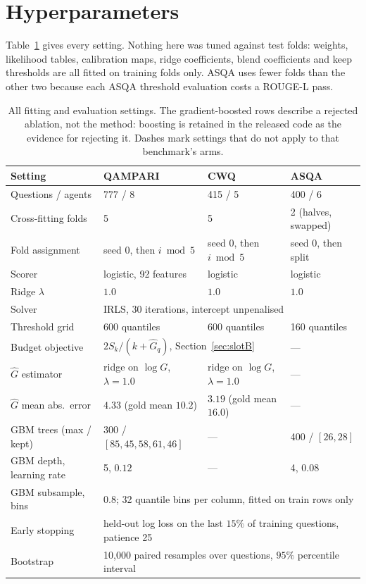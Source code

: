 \documentclass[11pt]{article}
\begin{document}
\section{Hyperparameters}
\label{app:hyper}

Table~\ref{tab:hyper} gives every setting. Nothing here was tuned against test folds: weights, likelihood tables, calibration maps, ridge coefficients, blend coefficients and keep thresholds are all fitted on training folds only. ASQA uses fewer folds than the other two because each ASQA threshold evaluation costs a ROUGE-L pass.

\begin{table}[t]
  \caption{All fitting and evaluation settings. The gradient-boosted rows describe a rejected ablation, not the method: boosting is retained in the released code as the evidence for rejecting it. Dashes mark settings that do not apply to that benchmark's arms.}
  \label{tab:hyper}
  \centering
  \begin{tabular}{llll}
    \toprule
    Setting & QAMPARI & CWQ & ASQA \\
    \midrule
    Questions / agents          & 777 / 8 & 415 / 5 & 400 / 6 \\
    Cross-fitting folds         & 5 & 5 & 2 (halves, swapped) \\
    Fold assignment             & seed 0, then $i \bmod 5$ & seed 0, then $i \bmod 5$ & seed 0, then split \\
    \midrule
    Scorer                      & logistic, 92 features & logistic & logistic \\
    Ridge $\lambda$             & $1.0$ & $1.0$ & $1.0$ \\
    Solver                      & \multicolumn{3}{l}{IRLS, 30 iterations, intercept unpenalised} \\
    Threshold grid              & 600 quantiles & 600 quantiles & 160 quantiles \\
    \midrule
    Budget objective            & \multicolumn{2}{l}{$2S_k / (k + \hat{G}_q)$, Section~\ref{sec:slotB}} & --- \\
    $\hat{G}$ estimator         & ridge on $\log G$, $\lambda = 1.0$ & ridge on $\log G$, $\lambda = 1.0$ & --- \\
    $\hat{G}$ mean abs.\ error  & $4.33$ (gold mean $10.2$) & $3.19$ (gold mean $16.0$) & --- \\
    \midrule
    GBM trees (max / kept)      & 300 / $[85, 45, 58, 61, 46]$ & --- & 400 / $[26, 28]$ \\
    GBM depth, learning rate    & 5, $0.12$ & --- & 4, $0.08$ \\
    GBM subsample, bins         & \multicolumn{3}{l}{$0.8$; 32 quantile bins per column, fitted on train rows only} \\
    Early stopping              & \multicolumn{3}{l}{held-out log loss on the last $15\%$ of training questions, patience 25} \\
    \midrule
    Bootstrap                   & \multicolumn{3}{l}{10,000 paired resamples over questions, $95\%$ percentile interval} \\
    \bottomrule
  \end{tabular}
\end{table}
\end{document}
